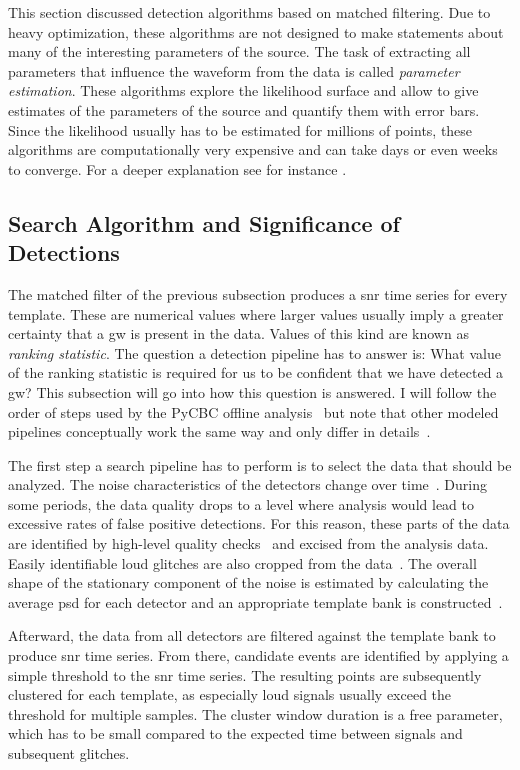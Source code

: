 This section discussed detection algorithms based on matched filtering. Due to heavy optimization, these algorithms are not designed to make statements about many of the interesting parameters of the source. The task of extracting all parameters that influence the waveform from the data is called \emph{parameter estimation}. These algorithms explore the likelihood surface and allow to give estimates of the parameters of the source and quantify them with error bars. Since the likelihood usually has to be estimated for millions of points, these algorithms are computationally very expensive and can take days or even weeks to converge. For a deeper explanation see for instance \cite{LIGOScientific:2016vlm, Biwer:2018osg, LIGOScientific:2019hgc}.


\subsection{Search Algorithm and Significance of Detections}
The matched filter of the previous subsection produces a \acrshort{snr} time series for every template. These are numerical values where larger values usually imply a greater certainty that a \acrshort{gw} is present in the data. Values of this kind are known as \emph{ranking statistic}. The question a detection pipeline has to answer is: What value of the ranking statistic is required for us to be confident that we have detected a \acrshort{gw}? This subsection will go into how this question is answered. I will follow the order of steps used by the PyCBC offline analysis~\cite{Usman:2015kfa} but note that other modeled pipelines conceptually work the same way and only differ in details~\cite{Messick:2016aqy, Adams:2015ulm}.

The first step a search pipeline has to perform is to select the data that should be analyzed. The noise characteristics of the detectors change over time~\cite{LIGOScientific:2019hgc}. During some periods, the data quality drops to a level where analysis would lead to excessive rates of false positive detections. For this reason, these parts of the data are identified by high-level quality checks~\cite{LIGO:2021ppb} and excised from the analysis data. Easily identifiable loud glitches are also cropped from the data~\cite{LIGO:2021ppb}. The overall shape of the stationary component of the noise is estimated by calculating the average \acrshort{psd} for each detector and an appropriate template bank is constructed~\cite{Usman:2015kfa}.

Afterward, the data from all detectors are filtered against the template bank to produce \acrshort{snr} time series. From there, candidate events are identified by applying a simple threshold to the \acrshort{snr} time series. The resulting points are subsequently clustered for each template, as especially loud signals usually exceed the threshold for multiple samples. The cluster window duration is a free parameter, which has to be small compared to the expected time between signals and subsequent glitches.

